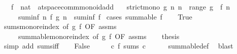 \begin{isabellebody}
\ \ \ f\ {\isacharcolon}{\kern0pt}{\isacharcolon}{\kern0pt}\ {\isachardoublequoteopen}nat\ {\isasymRightarrow}\ {\isacharprime}{\kern0pt}a{\isacharcolon}{\kern0pt}{\isacharcolon}{\kern0pt}{\isacharbraceleft}{\kern0pt}t{}{\isacharunderscore}{\kern0pt}space{\isacharcomma}{\kern0pt}comm{\isacharunderscore}{\kern0pt}monoid{\isacharunderscore}{\kern0pt}add{\isacharbraceright}{\kern0pt}{\isachardoublequoteclose}\isanewline
\ \ \ {\isachardoublequoteopen}strict{\isacharunderscore}{\kern0pt}mono\ g{\isachardoublequoteclose}\ {\isachardoublequoteopen}{\isasymAnd}n{\isachardot}{\kern0pt}\ n\ {\isasymnotin}\ range\ g\ {\isasymLongrightarrow}\ f\ n\ {\isacharequal}{\kern0pt}\ {}{\isachardoublequoteclose}\isanewline
\ \ \ \ \ {\isachardoublequoteopen}suminf\ {\isacharparenleft}{\kern0pt}{\isasymlambda}n{\isachardot}{\kern0pt}\ f\ {\isacharparenleft}{\kern0pt}g\ n{\isacharparenright}{\kern0pt}{\isacharparenright}{\kern0pt}\ {\isacharequal}{\kern0pt}\ suminf\ f{\isachardoublequoteclose}\isanewline
%
\isadelimproof
%
\endisadelimproof
%
\isatagproof
{}\isamarkupfalse%
\ {\isacharparenleft}{\kern0pt}cases\ {\isachardoublequoteopen}summable\ f{\isachardoublequoteclose}{\isacharparenright}{\kern0pt}\isanewline
\ \ \isamarkupfalse%
\ True\isanewline
\ \ \isamarkupfalse%
\ sums{\isacharunderscore}{\kern0pt}mono{\isacharunderscore}{\kern0pt}reindex\ {\isacharbrackleft}{\kern0pt}of\ g\ f{\isacharcomma}{\kern0pt}\ OF\ assms{\isacharbrackright}{\kern0pt}\isanewline
\ \ \ \ \ summable{\isacharunderscore}{\kern0pt}mono{\isacharunderscore}{\kern0pt}reindex\ {\isacharbrackleft}{\kern0pt}of\ g\ f{\isacharcomma}{\kern0pt}\ OF\ assms{\isacharbrackright}{\kern0pt}\isanewline
\ \ \isamarkupfalse%
\ {\isacharquery}{\kern0pt}thesis\isanewline
\ \ \ \ \isamarkupfalse%
\ {\isacharparenleft}{\kern0pt}simp\ add{\isacharcolon}{\kern0pt}\ sums{\isacharunderscore}{\kern0pt}iff{\isacharparenright}{\kern0pt}\isanewline
{}\isamarkupfalse%
\isanewline
\ \ \isamarkupfalse%
\ False\isanewline
\ \ \isamarkupfalse%
\ \isamarkupfalse%
\ {\isachardoublequoteopen}{\isasymnot}{\isacharparenleft}{\kern0pt}{\isasymexists}c{\isachardot}{\kern0pt}\ f\ sums\ c{\isacharparenright}{\kern0pt}{\isachardoublequoteclose}\isanewline
\ \ \ \ \isamarkupfalse%
\ summable{\isacharunderscore}{\kern0pt}def\ \isamarkupfalse%
\ blast\isanewline
\ \ \isamarkupfalse%

\end{isabellebody}
